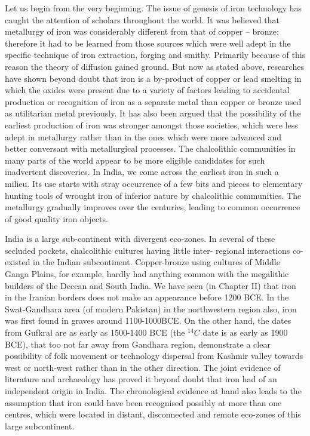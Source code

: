 Let us begin from the very beginning. The issue of genesis of iron technology has caught the attention of scholars throughout the world. It was believed that metallurgy of iron was considerably different from that of copper – bronze; therefore it had to be learned from those sources which were well adept in the specific technique of iron extraction, forging and smithy. Primarily because of this reason the theory of diffusion gained ground. But now as stated above, researches have shown beyond doubt that iron is a by-product of copper or lead smelting in which the oxides were present due to a variety of factors leading to accidental production or recognition of iron as a separate metal than copper or bronze used as utilitarian metal previously. It has also been argued that the possibility of the earliest production of iron was stronger amongst those societies, which were less adept in metallurgy rather than in the ones which were more advanced and better conversant with metallurgical processes. The chalcolithic communities in many parts of the world appear to be more eligible candidates for such inadvertent discoveries. In India, we come across the earliest iron in such a milieu. Its use starts with stray occurrence of a few bits and pieces to elementary hunting tools of wrought iron of inferior nature by chalcolithic communities. The metallurgy gradually improves over the centuries, leading to common occurrence of good quality iron objects. 

India is a large sub-continent with divergent eco-zones. In several of these secluded pockets, chalcolithic cultures having little inter- regional interactions co-existed in the Indian subcontinent. Copper-bronze using cultures of Middle Ganga Plains, for example, hardly had anything common with the megalithic builders of the Deccan and South India. We have seen (in Chapter II) that iron in the Iranian borders does not make an appearance before 1200 BCE. In the Swat-Gandhara area (of modern Pakistan) in the northwestern region also, iron was first found in graves around 1100-1000BCE. On the other hand, the dates from Gufkral are as early as 1500-1400 BCE (the ${}^{14}C$ date is as early as 1900 BCE), that too not far away from Gandhara region, demonstrate a clear possibility of folk movement or technology dispersal from Kashmir valley towards west or north-west rather than in the other direction. The joint evidence of literature and archaeology has proved it beyond doubt that iron had of an independent origin in India. The chronological evidence at hand also leads to the assumption that iron could have been recognised possibly at more than one centres, which were located in distant, disconnected and remote eco-zones of this large subcontinent. 

